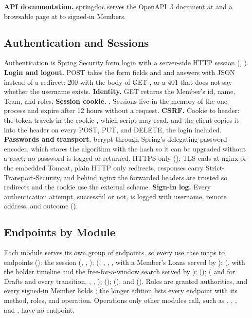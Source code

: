 \textbf{API documentation.} springdoc serves the OpenAPI~3 document at  and a browsable page at  to signed-in Members.

\subsection{Authentication and Sessions}

Authentication is Spring Security form login with a server-side HTTP session (, ). \textbf{Login and logout.} POST  takes the form fields  and  and answers with JSON instead of a redirect: 200 with the body of GET , or a 401 that does not say whether the username exists. \textbf{Identity.} GET  returns the Member's id, name, Team, and roles. \textbf{Session cookie.} . Sessions live in the memory of the one process and expire after 12 hours without a request. \textbf{CSRF.} Cookie to header: the token travels in the cookie , which script may read, and the client copies it into the header  on every POST, PUT, and DELETE, the login included. \textbf{Passwords and transport.} bcrypt through Spring's delegating password encoder, which stores the algorithm with the hash so it can be upgraded without a reset; no password is logged or returned. HTTPS only (): TLS ends at nginx or the embedded Tomcat, plain HTTP only redirects, responses carry Strict-Transport-Security, and behind nginx the forwarded headers are trusted so redirects and the  cookie use the external scheme. \textbf{Sign-in log.} Every authentication attempt, successful or not, is logged with username, remote address, and outcome ().

\subsection{Endpoints by Module}

Each module serves its own group of endpoints, so every use case maps to endpoints (): the session (, , );  (, , , , with a Member's Loans served by );  (, with the holder timeline and the free-for-a-window search served by );  ();  ( and  for Drafts and every transition, , , );  ();  (); and  (). Roles are granted authorities, and every signed-in Member holds ; the longer edition lists every endpoint with its method, roles, and operation. Operations only other modules call, such as , , , and , have no endpoint.

